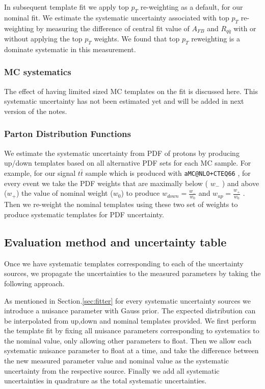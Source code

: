 In subsequent template fit we apply top $p_T$ re-weighting as a default, for our nominal fit. We estimate the systematic uncertainty associated with top $p_T$ re-weighting by measuring the difference of central fit value of $A_{FB}$ and $R_{q\bar{q}}$ with or without applying the top $p_T$ weights. We found that top $p_T$ reweighting is a dominate systematic in this measurement. 

\subsubsection{MC systematics}

The effect of having limited sized MC templates on the fit is discussed here. This systematic uncertainty has not been estimated yet and will be added in next version of the notes.

\subsubsection{Parton Distribution Functions}

We estimate the systematic uncertainty from PDF of protons by producing up/down templates based on all alternative PDF sets for each MC sample. For example, for our signal $t\bar{t}$ sample which is produced with \texttt{aMC@NLO+CTEQ66} , for every event we take the PDF weights that are maximally below ( $w_-$ ) and above ($w_+$) the value of nominal weight ($w_0$) to produce $w_{down}=\frac{w_-}{w_0}$ and $w_{up}=\frac{w_+}{w_0}$ . Then we re-weight the nominal templates using these two set of weights to produce systematic templates for PDF uncertainty. 

\subsection{Evaluation method and uncertainty table}

Once we have systematic templates corresponding to each of the uncertainty sources, we propagate the uncertainties to the measured parameters by taking the following approach. 

As mentioned in Section.\ref{sec:fitter} for every systematic uncertainty sources we introduce a nuisance parameter with Gauss prior. The expected distribution can be interpolated from up,down and nominal templates provided. We first perform the template fit by fixing all nuisance parameters corresponding to systematics to the nominal value, only allowing other parameters to float. Then we allow each systematic nuisance parameter to float at a time, and take the difference between the new measured parameter value and nominal value as the systematic uncertainty from the respective source. Finally we add all systematic uncertainties in quadrature  as the total systematic uncertainties. 

